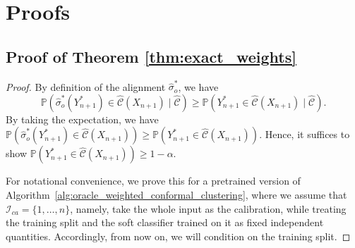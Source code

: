 \documentclass[11pt,letterpaper]{article}
\theoremstyle{definition}
\newcommand{\cC}{\mathcal{C}}
\newcommand{\cI}{\mathcal{I}}
\renewcommand{\P}{\mathbb{P}}
\begin{document}
\section{Proofs}
\label{sec:proofs}
\subsection{Proof of Theorem \ref{thm:exact_weights}}

\begin{proof}
By definition of the alignment $\hat{\sigma}_o^\ast$, we have 
\begin{equation*}
    \P\left(\hat{\sigma}_o^\ast(Y_{n + 1}^\ast) \in \hat{\cC}(X_{n + 1}) \mid \hat{\cC}\right) \ge \P\left(Y_{n + 1}^\ast \in \hat{\cC}(X_{n + 1}) \mid \hat{\cC}\right).
\end{equation*}
By taking the expectation, we have $\P(\hat{\sigma}_o^\ast(Y_{n + 1}^\ast) \in \hat{\cC}(X_{n + 1})) \ge \P(Y_{n + 1}^\ast \in \hat{\cC}(X_{n + 1}))$. Hence, it suffices to show $\P(Y_{n + 1}^\ast \in \hat{\cC}(X_{n + 1})) \ge 1 - \alpha$. 

For notational convenience, we prove this for a pretrained version of Algorithm~\ref{alg:oracle_weighted_conformal_clustering}, where we assume that $\cI_{ca} = \{1, \ldots, n\}$, namely, take the whole input as the calibration, while treating the training split and the soft classifier trained on it as fixed independent quantities. Accordingly, from now on, we will condition on the training split. 


\end{proof}
\end{document}

